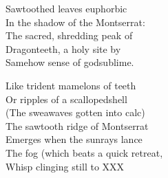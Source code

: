 
Sawtoothed leaves euphorbic \\
In the shadow of the Montserrat: \\
The sacred, shredding peak of \\
Dragonteeth, a holy site by \\
Samehow sense of godsublime. 

Like trident mamelons of teeth \\
Or ripples of a scallopedshell \\
(The sweawaves gotten into calc) \\
The sawtooth ridge of Montserrat \\
Emerges when the sunrays lance \\
The fog (which beats a quick retreat, \\
Whisp clinging still to XXX





